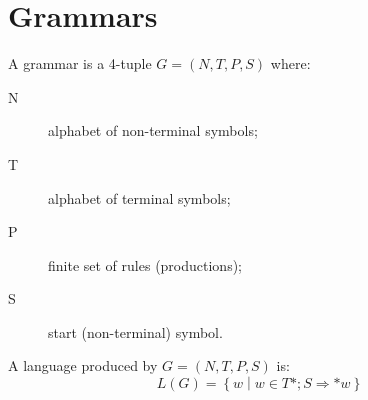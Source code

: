 \section{Grammars}
A grammar is a 4-tuple $G = (N, T, P, S)$ where:
\begin{description}
	\item[N] alphabet of non-terminal symbols;
	\item[T] alphabet of terminal symbols;
	\item[P] finite set of rules (productions);
	\item[S] start (non-terminal) symbol.
\end{description}

A language produced by $G = (N, T, P, S)$ is:
$$
	L(G) = \left\{w \middle| w \in T\ast ; S \Rightarrow\ast w\right\}
$$